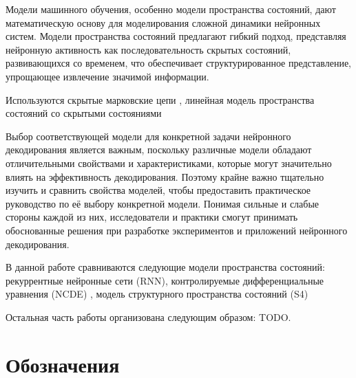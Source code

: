 \documentclass[a4paper, 12pt]{article}
\begin{document}
	Модели машинного обучения, особенно модели пространства состояний, дают математическую основу для моделирования сложной динамики нейронных систем.
	Модели пространства состояний предлагают гибкий подход, представляя нейронную активность как последовательность скрытых состояний, развивающихся со временем, что обеспечивает структурированное представление, упрощающее извлечение значимой информации.
	
	Используются скрытые марковские цепи \citep{paninski2010new}, линейная модель пространства состояний со скрытыми состояниями \citep{wu2009neural}
	
	Выбор соответствующей модели для конкретной задачи нейронного декодирования является важным, поскольку различные модели обладают отличительными свойствами и характеристиками, которые могут значительно влиять на эффективность декодирования.
	Поэтому крайне важно тщательно изучить и сравнить свойства моделей, чтобы предоставить практическое руководство по её выбору конкретной модели. 
	Понимая сильные и слабые стороны каждой из них, исследователи и практики смогут принимать обоснованные решения при разработке экспериментов и приложений нейронного декодирования.
	
	В данной работе сравниваются следующие модели пространства состояний: рекуррентные нейронные сети (RNN), контролируемые дифференциальные уравнения (NCDE) \citep{ncde}, модель структурного пространства состояний (S4) \citep{s4}
	
	Остальная часть работы организована следующим образом: TODO. %
	
	
	\newpage
	\section*{Обозначения}
	
\end{document}
